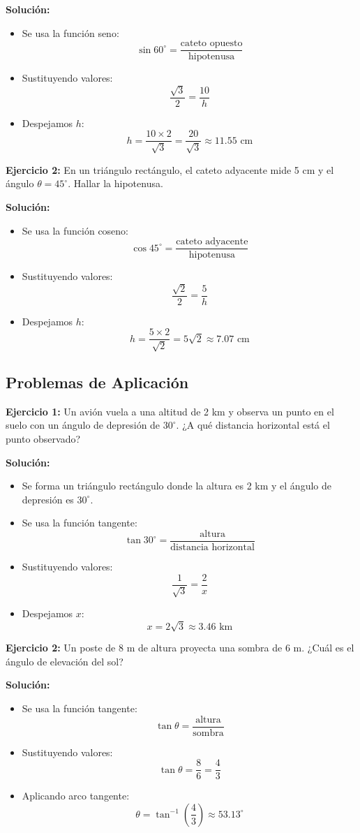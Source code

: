 \documentclass{profesor}
\begin{document}
\textbf{Solución:}  
\begin{itemize}
    \item Se usa la función seno:
    \[
    \sin 60^\circ = \frac{\text{cateto opuesto}}{\text{hipotenusa}}
    \]
    \item Sustituyendo valores:
    \[
    \frac{\sqrt{3}}{2} = \frac{10}{h}
    \]
    \item Despejamos \( h \):
    \[
    h = \frac{10 \times 2}{\sqrt{3}} = \frac{20}{\sqrt{3}} \approx 11.55 \text{ cm}
    \]
\end{itemize}

\textbf{Ejercicio 2:}  
En un triángulo rectángulo, el cateto adyacente mide 5 cm y el ángulo \( \theta = 45^\circ \). Hallar la hipotenusa.

\textbf{Solución:}  
\begin{itemize}
    \item Se usa la función coseno:
    \[
    \cos 45^\circ = \frac{\text{cateto adyacente}}{\text{hipotenusa}}
    \]
    \item Sustituyendo valores:
    \[
    \frac{\sqrt{2}}{2} = \frac{5}{h}
    \]
    \item Despejamos \( h \):
    \[
    h = \frac{5 \times 2}{\sqrt{2}} = 5\sqrt{2} \approx 7.07 \text{ cm}
    \]
\end{itemize}

\newpage
\subsection{Problemas de Aplicación}

\textbf{Ejercicio 1:}  
Un avión vuela a una altitud de 2 km y observa un punto en el suelo con un ángulo de depresión de \( 30^\circ \). ¿A qué distancia horizontal está el punto observado?

\textbf{Solución:}  
\begin{itemize}
    \item Se forma un triángulo rectángulo donde la altura es 2 km y el ángulo de depresión es \( 30^\circ \).
    \item Se usa la función tangente:
    \[
    \tan 30^\circ = \frac{\text{altura}}{\text{distancia horizontal}}
    \]
    \item Sustituyendo valores:
    \[
    \frac{1}{\sqrt{3}} = \frac{2}{x}
    \]
    \item Despejamos \( x \):
    \[
    x = 2\sqrt{3} \approx 3.46 \text{ km}
    \]
\end{itemize}

\textbf{Ejercicio 2:}  
Un poste de 8 m de altura proyecta una sombra de 6 m. ¿Cuál es el ángulo de elevación del sol?

\textbf{Solución:}  
\begin{itemize}
    \item Se usa la función tangente:
    \[
    \tan \theta = \frac{\text{altura}}{\text{sombra}}
    \]
    \item Sustituyendo valores:
    \[
    \tan \theta = \frac{8}{6} = \frac{4}{3}
    \]
    \item Aplicando arco tangente:
    \[
    \theta = \tan^{-1} \left( \frac{4}{3} \right) \approx 53.13^\circ
    \]
\end{itemize}
\end{document}
